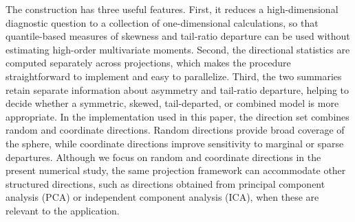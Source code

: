 \documentclass[11pt]{article}
\theoremstyle{plain}
\theoremstyle{definition}
\theoremstyle{remark}
\begin{document}

The construction has three useful features. First, it reduces a high-dimensional diagnostic question to a collection of one-dimensional calculations, so that quantile-based measures of skewness and tail-ratio departure can be used without estimating high-order multivariate moments. Second, the directional statistics are computed separately across projections, which makes the procedure straightforward to implement and easy to parallelize. Third, the two summaries retain separate information about asymmetry and tail-ratio departure, helping to decide whether a symmetric, skewed, tail-departed, or combined model is more appropriate. In the implementation used in this paper, the direction set combines random and coordinate directions. Random directions provide broad coverage of the sphere, while coordinate directions improve sensitivity to marginal or sparse departures. Although we focus on random and coordinate directions in the present numerical study, the same projection framework can accommodate other structured directions, such as directions obtained from principal component analysis (PCA) or independent component analysis (ICA), when these are relevant to the application.
\end{document}
